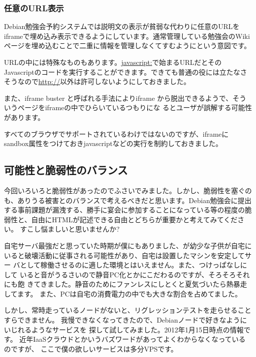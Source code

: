 \documentclass[mingoth,a4paper]{jsarticle}
\begin{document}
\subsubsection{任意のURL表示}

Debian勉強会予約システムでは説明文の表示が貧弱な代わりに任意のURLを
iframeで埋め込み表示できるようにしています。通常管理している勉強会のWiki
ページを埋め込むことで二重に情報を管理しなくてすむようにという意図です。

URLの中には特殊なものもあります。\url{javascript:}で始まるURLだとその
Javascriptのコードを実行することができます。できても普通の役には立たなさ
そうなので\url{http://}以外は許可しないようにしておきました。

また、iframe buster と呼ばれる手法によりiframe
から脱出できるようで、そういうページをiframeの中でひらいているつもりにな
るとユーザが誤解する可能性があります。

すべてのブラウザでサポートされているわけではないのですが、iframeに
sandbox属性をつけておきjavascriptなどの実行を制約しておきました。

\subsection{可能性と脆弱性のバランス}

今回いろいろと脆弱性があったのでふさいでみました。しかし、脆弱性を塞ぐの
も、ありうる被害とのバランスで考えるべきだと思います。Debian勉強会に提出
する事前課題が漏洩する、勝手に宴会に参加することになっている等の程度の脆
弱性と、自由にHTMLが記述できる自由とどちらが重要かと考えてみてください。
すこし悩ましいと思いませんか?


自宅サーバ最強だと思っていた時期が僕にもありました、が幼少な子供が自宅に
いると破壊活動に従事される可能性があり、自宅は設置したマシンを安定してサー
バとして稼働させるのに適した環境とはいえません。また、つけっぱなしにして
いると音がうるさいので静音PC化とかにこだわるのですが、そろそろそれにも飽
きてきました。静音のためにファンレスにしとくと夏気づいたら熱暴走してます。
また、PCは自宅の消費電力の中でも大きな割合を占めてました。

しかし、常時走っているノードがないと、リグレッションテストを走らせること
すらできません。
我慢できなくなってきたので、Debianノードで好きなようにいじれるようなサービスを
探して試してみました。2012年1月15日時点の情報です。
近年IaaSクラウドとかいうバズワードがあってよくわからなくなっているのですが、
ここで僕の欲しいサービスは多分VPSです。
\end{document}
